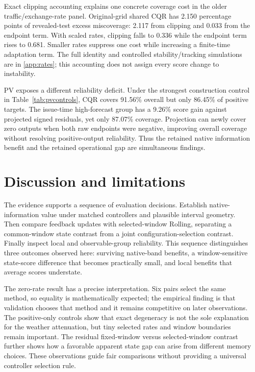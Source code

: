 \begin{table}[!htbp]\centering\scriptsize
\caption{Whole-test tradeoffs for the original new-source selector, four pairs
per source. ACI denotes issued CQR (identical to shared at $h=1$); gain is relative
to selected-window Rolling CQR. Coverage is percent and Local is percentage points.}
\label{tab:tradeoff}\end{table}

Exact clipping accounting explains one concrete coverage cost in the older
traffic/exchange-rate panel. Original-grid shared CQR has 2.150 percentage points
of revealed-test excess miscoverage: 2.117 from clipping and 0.033 from the endpoint
term. With scaled rates, clipping falls to 0.336 while the endpoint term rises to
0.681. Smaller rates suppress one cost while increasing a finite-time adaptation
term. The full identity and controlled stability/tracking simulations are in
\ref{app:rates}; this accounting does not assign every score change to instability.

PV exposes a different reliability deficit. Under the strongest construction
control in Table~\ref{tab:pvcontrols}, CQR covers 91.56\% overall but only 86.45\%
of positive targets. The issue-time high-forecast group has a 9.26\% score gain
against projected signed residuals, yet only 87.07\% coverage. Projection can
newly cover zero outputs when both raw endpoints were negative, improving overall
coverage without resolving positive-output reliability. Thus the retained native
information benefit and the retained operational gap are simultaneous findings.

\section{Discussion and limitations}
The evidence supports a sequence of evaluation decisions. Establish native-information
value under matched controllers and plausible interval geometry. Then compare
feedback updates with selected-window Rolling, separating a common-window state
contrast from a joint configuration-selection contrast. Finally inspect local and
observable-group reliability. This sequence distinguishes three outcomes observed
here: surviving native-band benefits, a window-sensitive state-score difference
that becomes practically small, and local benefits that average scores understate.

The zero-rate result has a precise interpretation. Six pairs select the same
method, so equality is mathematically expected; the empirical finding is that
validation chooses that method and it remains competitive on later observations.
The positive-only controls show that exact degeneracy is not the sole explanation
for the weather attenuation, but tiny selected rates and window boundaries remain
important. The residual fixed-window versus selected-window contrast further
shows how a favorable apparent state gap can arise from different memory choices.
These observations guide fair comparisons without providing a universal controller
selection rule.

